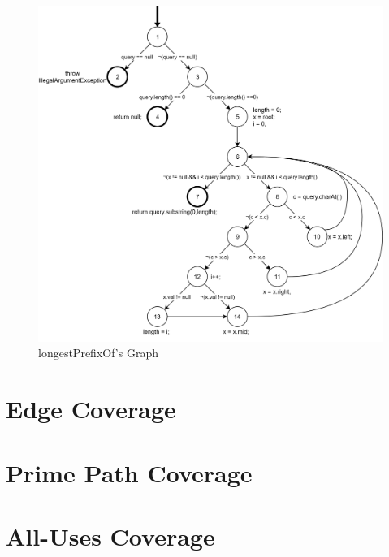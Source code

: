 \documentclass[12pt]{article}
\begin{document}
\begin{figure}[htb]
  	\centering
  	\includegraphics[scale=0.15]{longestPrefixOfGraph.png}
  	\caption{longestPrefixOf's Graph}
\end{figure}


\section{Edge Coverage}

\section{Prime Path Coverage}



\section{All-Uses Coverage }
\end{document}

